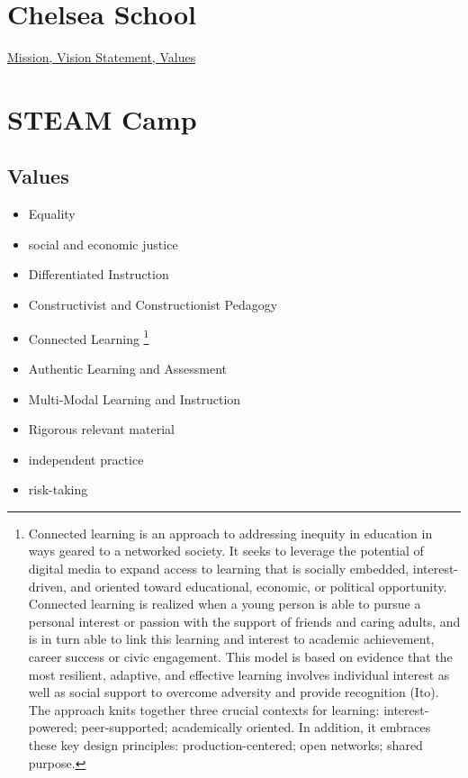 \documentclass[letterpaper,10pt,english]{sphinxmanual}
\begin{document}
\section{Chelsea School}
\label{philosophy:chelsea-school}
\href{http://chelseaschool.edu/about/philosophy}{Mission, Vision Statement, Values}


\section{STEAM Camp}
\label{philosophy:steam-camp}

\subsection{Values}
\label{philosophy:values}\begin{itemize}
\item {} 
Equality

\item {} 
social and economic justice

\item {} 
Differentiated Instruction

\item {} 
Constructivist and Constructionist Pedagogy

\item {} 
Connected Learning \footnote{
Connected learning is an approach to addressing inequity in education in ways geared to a networked society. It seeks to leverage the potential of digital media to expand access to learning that is socially embedded, interest-driven, and oriented toward educational, economic, or political opportunity. Connected learning is realized when a young person is able to pursue a personal interest or passion with the support of friends and caring adults, and is in turn able to link this learning and interest to academic achievement, career success or civic engagement. This model is based on evidence that the most resilient, adaptive, and effective learning involves individual interest as well as social support to overcome adversity and provide recognition (Ito). The approach knits together three crucial contexts for learning: interest-powered; peer-supported; academically oriented. In addition, it embraces these key design principles: production-centered; open networks; shared purpose.
}

\item {} 
Authentic Learning and Assessment

\item {} 
Multi-Modal Learning and Instruction

\item {} 
Rigorous relevant material

\item {} 
independent practice

\item {} 
risk-taking

\end{itemize}
\end{document}
